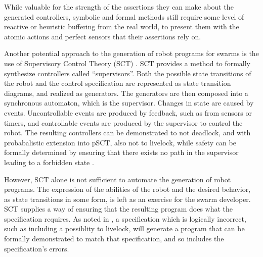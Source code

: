 While valuable for the strength of the assertions they can make about the generated controllers, symbolic and formal methods still require some level of reactive or heuristic buffering from the real world, to present them with the atomic actions and perfect sensors that their assertions rely on. 

Another potential approach to the generation of robot programs for swarms is the use of Supervisory Control Theory (SCT) \citep{lopes2016supervisory}.
SCT provides a method to formally synthesize controllers called ``supervisors''. 
Both the possible state transitions of the robot and the control specification are represented as state transition diagrams, and realized as generators. 
The generators are then composed into a synchronous automaton, which is the supervisor. 
Changes in state are caused by events.
Uncontrollable events are produced by feedback, such as from sensors or timers, and controllable events are produced by the supervisor to control the robot. 
The resulting controllers can be demonstrated to not deadlock, and with probabalistic extension into pSCT, also not to livelock, while safety can be formally determined by ensuring that there exists no path in the supervisor leading to a forbidden state \citep{lopes2017probabilistic}. 

However, SCT alone is not sufficient to automate the generation of robot programs.
The expression of the abilities of the robot and the desired behavior, as state transitions in some form, is left as an exercise for the swarm developer. 
SCT supplies a way of ensuring that the resulting program does what the specification requires. 
As noted in \citep{lopes2017probabilistic}, a specification which is logically incorrect, such as including a possiblity to livelock, will generate a program that can be formally demonstrated to match that specification, and so includes the specification's errors. 

